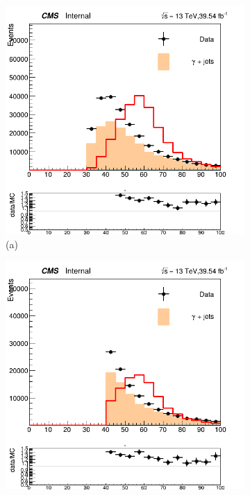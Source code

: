 \begin{figure}[!ht]
    \captionsetup[subfigure]{labelformat=empty}
    \vspace*{-0.2cm}
    \centering
    \setlength{\mylength}{\textwidth}
    \begin{subfigure}[t]{0.50\mylength}
        \centering
        \includegraphics[width=0.45\mylength]{resources/plots/Phi3_pt.png}
        \caption{\footnotesize (a)}
    \end{subfigure}%
    \begin{subfigure}[t]{0.50\mylength}
        \centering
        \includegraphics[width=0.45\mylength]{resources/plots/Omega_pt.png}

\end{subfigure}
\end{figure}
